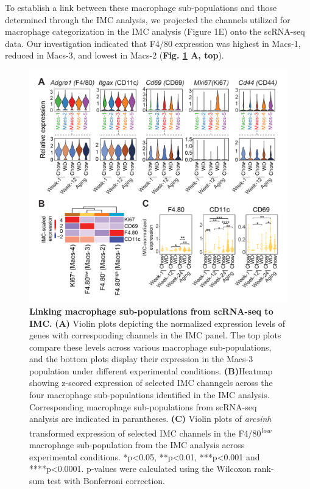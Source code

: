 To establish a link between these macrophage sub-populations and those determined through the IMC analysis, we projected the channels utilized for macrophage categorization in the IMC analysis (Figure 1E) onto the scRNA-seq data. Our investigation indicated that F4/80 expression was highest in Macs-1, reduced in Macs-3, and lowest in Macs-2 (\textbf{Fig. \ref{fig2-4} A, top}). 

\begin{figure}[H]
\centering
\includegraphics[width=\linewidth]{Chapter4/Fig/F2-4-01.png}
\caption[res-macs2]{\textbf{Linking macrophage sub-populations from scRNA-seq to IMC.} \textbf{(A)} Violin plots depicting the normalized expression levels of genes with corresponding channels in the IMC panel. The top plots compare these levels across various macrophage sub-populations, and the bottom plots display their expression in the Macs-3 population under different experimental conditions. \textbf{(B)}Heatmap showing z-scored expression of selected IMC channgels across the four macrophage sub-populations identified in the IMC analysis. Corresponding macrophage sub-populations from scRNA-seq analysis are indicated in parantheses. \textbf{(C)} Violin plots of \textit{arcsinh} transformed expression of selected IMC channels in the F4/80\textsuperscript{\textit{low}} macrophage sub-population from the IMC analysis across experimental conditions. *p<0.05, **p<0.01, ***p<0.001 and ****p<0.0001. p-values were calculated using the Wilcoxon rank-sum test with Bonferroni correction.} 
\label{fig2-4}
\end{figure}


